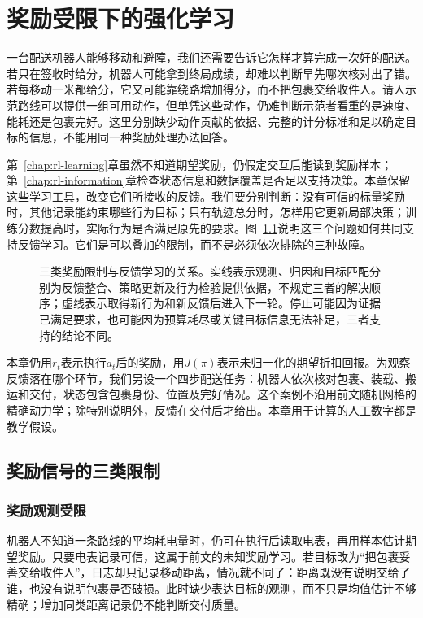 \chapter{奖励受限下的强化学习}
\label{chap:rl-reward}

一台配送机器人能够移动和避障，我们还需要告诉它怎样才算完成一次好的配送。若只在签收时给分，机器人可能拿到终局成绩，却难以判断早先哪次核对出了错。若每移动一米都给分，它又可能靠绕路增加得分，而不把包裹交给收件人。请人示范路线可以提供一组可用动作，但单凭这些动作，仍难判断示范者看重的是速度、能耗还是包裹完好。这里分别缺少动作贡献的依据、完整的计分标准和足以确定目标的信息，不能用同一种奖励处理办法回答。

第~\ref{chap:rl-learning}章虽然不知道期望奖励，仍假定交互后能读到奖励样本；第~\ref{chap:rl-information}章检查状态信息和数据覆盖是否足以支持决策。本章保留这些学习工具，改变它们所接收的反馈。我们要分别判断：没有可信的标量奖励时，其他记录能约束哪些行为目标；只有轨迹总分时，怎样用它更新局部决策；训练分数提高时，实际行为是否满足原先的要求。图~\ref{fig:rl-reward-map}说明这三个问题如何共同支持反馈学习。它们是可以叠加的限制，而不是必须依次排除的三种故障。

\begin{figure}[htbp]
  \centering
  
  \caption{三类奖励限制与反馈学习的关系。实线表示观测、归因和目标匹配分别为反馈整合、策略更新及行为检验提供依据，不规定三者的解决顺序；虚线表示取得新行为和新反馈后进入下一轮。停止可能因为证据已满足要求，也可能因为预算耗尽或关键目标信息无法补足，三者支持的结论不同。}
  \label{fig:rl-reward-map}
\end{figure}

本章仍用$r_t$表示执行$a_t$后的奖励，用$J(\pi)$表示未归一化的期望折扣回报。为观察反馈落在哪个环节，我们另设一个四步配送任务：机器人依次核对包裹、装载、搬运和交付，状态包含包裹身份、位置及完好情况。这个案例不沿用前文随机网格的精确动力学；除特别说明外，反馈在交付后才给出。本章用于计算的人工数字都是教学假设。

\section{奖励信号的三类限制}
\label{sec:rl-reward-limits}

\subsection{奖励观测受限}
\label{sec:rl-reward-observation}

机器人不知道一条路线的平均耗电量时，仍可在执行后读取电表，再用样本估计期望奖励。只要电表记录可信，这属于前文的未知奖励学习。若目标改为“把包裹妥善交给收件人”，日志却只记录移动距离，情况就不同了：距离既没有说明交给了谁，也没有说明包裹是否破损。此时缺少表达目标的观测，而不只是均值估计不够精确；增加同类距离记录仍不能判断交付质量。

